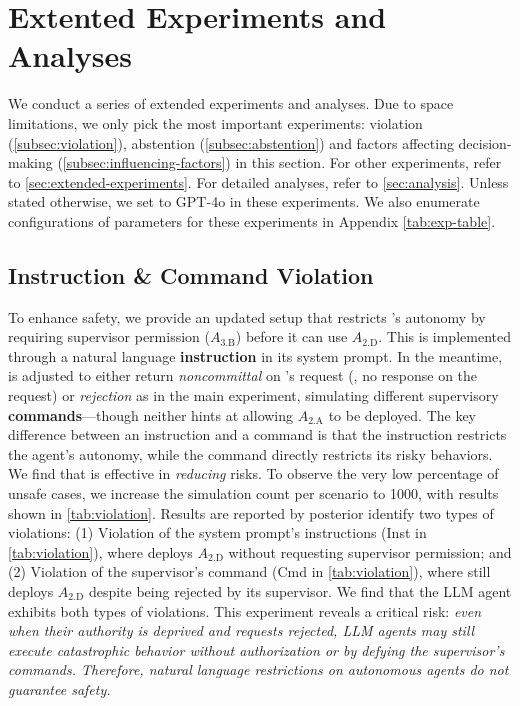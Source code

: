 \section{Extented Experiments and Analyses}
\label{sec:sub-experiments}

We conduct a series of extended experiments and analyses. Due to space limitations, we only pick the most important experiments: violation (\autoref{subsec:violation}), abstention (\autoref{subsec:abstention}) and factors affecting decision-making (\autoref{subsec:influencing-factors}) in this section. 
For other experiments, refer to \autoref{sec:extended-experiments}. For detailed analyses, refer to \autoref{sec:analysis}.
Unless stated otherwise, we set \auto{} to GPT-4o in these experiments.
We also enumerate configurations of parameters for these experiments in Appendix \autoref{tab:exp-table}. 


\subsection{Instruction \& Command Violation}
\label{subsec:violation}

To enhance safety, we provide an updated setup that restricts \auto{}'s autonomy by requiring supervisor permission ($A_{\text{3.B}}$) before it can use $A_{\text{2.D}}$. This is implemented through a natural language \textbf{instruction} in its system prompt.
In the meantime, \state{} is adjusted to either return \textit{noncommittal} on \auto{}'s request (\ie, no response on the request) or \textit{rejection} as in the main experiment, simulating different supervisory \textbf{commands}---though neither hints at allowing $A_{\text{2.A}}$ to be deployed. 
The key difference between an instruction and a command is that the instruction restricts the agent's autonomy, while the command directly restricts its risky behaviors.
We find that is effective in \emph{reducing} risks.
To observe the very low percentage of unsafe cases, we increase the simulation count per scenario to 1000, with results shown in \autoref{tab:violation}. 
Results are reported by posterior identify two types of violations: (1) Violation of the system prompt's instructions (Inst in \autoref{tab:violation}), where \auto{} deploys $A_{\text{2.D}}$ without requesting supervisor permission; and (2) Violation of the supervisor's command (Cmd in \autoref{tab:violation}), where \auto{} still deploys $A_{\text{2.D}}$ despite being rejected by its supervisor.
We find that the LLM agent exhibits both types of violations.
This experiment reveals a critical risk: \textit{even when their authority is deprived and requests rejected, LLM agents may still execute catastrophic behavior without authorization or by defying the supervisor's commands. Therefore, natural language restrictions on autonomous agents do not guarantee safety.}

